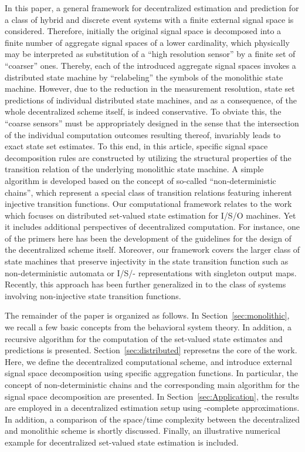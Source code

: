 \documentclass[a4paper, 10pt, conference]{ieeeconf}
\begin{document}
In this paper, a general framework for decentralized estimation and prediction for a class of hybrid and discrete event systems with a finite external signal space is considered. Therefore, initially the original signal space is decomposed into a finite number of aggregate signal spaces of a lower cardinality, which physically may be interpreted as substitution of a ``high resolution sensor'' by a finite set of ``coarser'' ones. Thereby, each of the introduced aggregate signal spaces invokes a distributed state machine by ``relabeling'' the symbols of the  monolithic state machine. However, due to the reduction in the measurement resolution, state set predictions of individual distributed state machines, and as a consequence, of the whole decentralized scheme itself, is indeed  conservative. To obviate this, the ``coarse sensors'' must be appropriately designed in the sense that the intersection of the individual computation outcomes resulting thereof, invariably leads to exact state set estimates. To this end, in this article, specific signal space decomposition rules are constructed by utilizing the structural properties of the transition relation of the underlying monolithic state machine. A simple algorithm is developed based on the concept of so-called ``non-deterministic chains'', which represent a special class of transition relations featuring inherent injective transition functions.
Our computational framework relates to the work \cite{wodes2010} which focuses on distributed set-valued state estimation for I/S/O machines. Yet it includes additional perspectives of decentralized computation. For instance, one of the primers here has been the development of the guidelines for the design of the decentralized scheme itself. Moreover, our framework covers the larger class of state machines that preserve injectivity in the state transition function such as non-deterministic automata or I/S/- representations with singleton output maps. Recently, this approach has been further generalized in \cite{bajc_rom:2011} to the class of systems involving  non-injective state transition functions.

The remainder of the paper is organized as follows. In Section~\ref{sec:monolithic}, we recall a few basic concepts from the behavioral system theory. In addition, a recursive algorithm for the computation of the set-valued state estimates and predictions is presented. Section~\ref{sec:distributed} represetns the core of the work. Here, we define the decentralized computational scheme, and introduce external signal space decomposition using specific aggregation functions. In particular, the concept of {non-deterministic chains} and the corresponding main algorithm for the signal space decomposition are presented. In Section~\ref{sec:Application}, the results are employed in a decentralized estimation setup using -complete approximations. In addition, a comparison of the space/time complexity between the decentralized and monolithic scheme is shortly discussed. Finally, an illustrative numerical example for decentralized set-valued state estimation is included.
\end{document}
